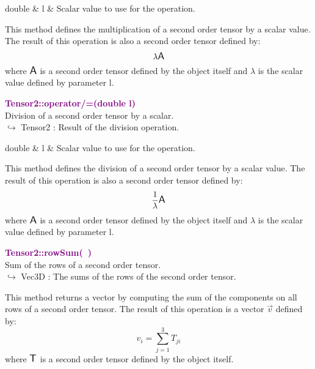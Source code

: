 \begin{tcolorbox}[width=\textwidth,myArgs,tabularx={ll|R}]
double & l & Scalar value to use for the operation.
\end{tcolorbox}

This method defines the multiplication of a second order tensor by a scalar value.
The result of this operation is also a second order tensor defined by:
\begin{equation*}
\lambda \mbox{\large\ensuremath{\mathsf{A}}}
\end{equation*}
where $\mbox{\large\ensuremath{\mathsf{A}}}$ is a second order tensor defined by the object itself and $\lambda$ is the scalar value defined by parameter l.

\textcolor{purple}{\textbf{Tensor2::operator/=(double l)}}\label{Tensor2::operator/=(double l)}\\
Division of a second order tensor by a scalar.\\ \hspace*{10mm}$\hookrightarrow$ Tensor2 : Result of the division operation.

\begin{tcolorbox}[width=\textwidth,myArgs,tabularx={ll|R}]
double & l & Scalar value to use for the operation.
\end{tcolorbox}

This method defines the division of a second order tensor by a scalar value.
The result of this operation is also a second order tensor defined by:
\begin{equation*}
\frac{1}{\lambda} \mbox{\large\ensuremath{\mathsf{A}}}
\end{equation*}
where $\mbox{\large\ensuremath{\mathsf{A}}}$ is a second order tensor defined by the object itself and $\lambda$ is the scalar value defined by parameter l.

\textcolor{purple}{\textbf{Tensor2::rowSum(~)}}\label{Tensor2::rowSum()}\\
Sum of the rows of a second order tensor.\\ \hspace*{10mm}$\hookrightarrow$ Vec3D : The sums of the rows of the second order tensor.

This method returns a vector by computing the sum of the components on all rows of a second order tensor.
The result of this operation is a vector $\overrightarrow{v}$ defined by:
\begin{equation*}
v_{i}=\sum_{j=1}^{3} T_{ji}
\end{equation*}
where $\mbox{\large\ensuremath{\mathsf{T}}}$ is a second order tensor defined by the object itself.

